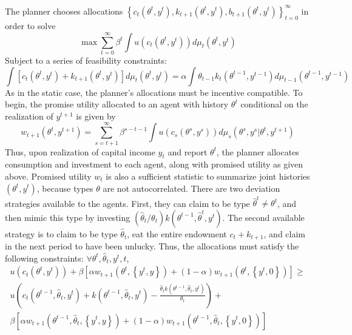 \documentclass[11pt]{article}
\begin{document}
The planner chooses allocations \( \left\{ c_{t}\left(\theta^{t},y^{t}\right),k_{t+1}\left(\theta^{t},y^{t}\right),b_{t+1}\left(\theta^{t},y^{t}\right) \right\}_{t=0}^\infty \) in order to solve
\begin{equation}
    \max\sum_{t=0}^{\infty}\beta^{t}\int u\left(c_{t}\left(\theta^{t},y^{t}\right)\right)d\mu_{t}\left(\theta^{t},y^{t}\right) \label{eqn:plan_prob_dyn}
\end{equation}
Subject to a series of feasibility constraints:
\begin{equation}
    \int\left[c_{t}\left(\theta^{t},y^{t}\right)+k_{t+1}\left(\theta^{t},y^{t}\right)\right]d\mu_{t}\left(\theta^{t},y^{t}\right)=\alpha\int\theta_{t-1}k_{t}\left(\theta^{t-1},y^{t-1}\right)d\mu_{t-1}\left(\theta^{t-1},y^{t-1}\right) \label{eqn:rc_dyn}
\end{equation}
As in the static case, the planner's allocations must be incentive compatible. To begin, the promise utility allocated to an agent with history \( \theta^{t} \) conditional on the realization of \( y^{t+1} \) is given by 
\begin{equation}
    w_{t+1}\left(\theta^{t},y^{t+1}\right)=\sum_{s=t+1}^{\infty}\beta^{s-t-1}\int u\left(c_{s}\left(\theta^{s},y^{s}\right)\right)d\mu_{s}\left(\theta^{s},y^{s}|\theta^{t},y^{t+1}\right) \label{eqn:promise_u}
\end{equation}
Thus, upon realization of capital income \( y_{t} \) and report \( \theta^{t} \), the planner allocates consumption and investment to each agent, along with promised utility as given above. Promised utility \( w_t \) is also a sufficient statistic to summarize joint histories \( \left( \theta^t,y^t \right) \), because types \( \theta \) are not autocorrelated. There are two deviation strategies available to the agents. First, they can claim to be type \( \hat{\theta}^{t}\ne\theta^{t} \), and then mimic this type by investing \( \left(\hat{\theta}_{t}/\theta_{t}\right)k\left(\theta^{t-1}, \hat{\theta}^{t}, y^t\right) \). The second available strategy is to claim to be type \( \hat{\theta}_{t} \), eat the entire endowment \( c_{t}+k_{t+1} \), and claim in the next period to have been unlucky. Thus, the allocations must satisfy the following constraints: 
\( \forall\theta^{t},\hat{\theta}_{t},y^{t},t \),
\begin{multline}
    u\left(c_{t}\left(\theta^{t},y^{t}\right)\right)+\beta\left[\alpha w_{t+1}\left(\theta^{t},\left\{ y^{t},y\right\} \right)+\left(1-\alpha\right)w_{t+1}\left(\theta^{t},\left\{ y^{t},0\right\} \right)\right]\geq \\ 
    u\left(c_{t}\left(\theta^{t-1},\hat{\theta}_{t},y^{t}\right)+k\left(\theta^{t-1},\hat{\theta}_{t},y^{t}\right)-\frac{\hat{\theta}_{t}k\left(\theta^{t-1},\hat{\theta}_{t},y^{t}\right)}{\theta_{t}}\right)+ \\ 
    \beta\left[\alpha w_{t+1}\left(\theta^{t-1},\hat{\theta}_{t},\left\{ y^{t},y\right\} \right)+\left(1-\alpha\right)w_{t+1}\left(\theta^{t-1},\hat{\theta}_{t},\left\{ y^{t},0\right\} \right)\right] \label{eqn:ics_t_dyn}
\end{multline}
\end{document}

